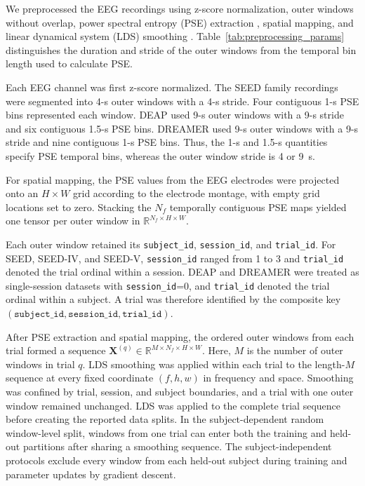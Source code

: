 ﻿\documentclass[12pt]{article}
\begin{document}
We preprocessed the EEG recordings using z-score normalization, outer windows without overlap, power spectral entropy (PSE) extraction \cite{PSE}, spatial mapping, and linear dynamical system (LDS) smoothing \cite{ref65}. Table~\ref{tab:preprocessing_params} distinguishes the duration and stride of the outer windows from the temporal bin length used to calculate PSE.

Each EEG channel was first z-score normalized. The SEED family recordings were segmented into 4-s outer windows with a 4-s stride. Four contiguous 1-s PSE bins represented each window. DEAP used 9-s outer windows with a 9-s stride and six contiguous 1.5-s PSE bins. DREAMER used 9-s outer windows with a 9-s stride and nine contiguous 1-s PSE bins. Thus, the 1-s and 1.5-s quantities specify PSE temporal bins, whereas the outer window stride is 4 or 9~s.

For spatial mapping, the PSE values from the EEG electrodes were projected onto an $H \times W$ grid according to the electrode montage, with empty grid locations set to zero. Stacking the $N_f$ temporally contiguous PSE maps yielded one tensor per outer window in $\mathbb{R}^{N_f \times H \times W}$.

Each outer window retained its \texttt{subject\_id}, \texttt{session\_id}, and \texttt{trial\_id}. For SEED, SEED-IV, and SEED-V, \texttt{session\_id} ranged from 1 to 3 and \texttt{trial\_id} denoted the trial ordinal within a session. DEAP and DREAMER were treated as single-session datasets with \texttt{session\_id}=0, and \texttt{trial\_id} denoted the trial ordinal within a subject. A trial was therefore identified by the composite key $(\texttt{subject\_id},\texttt{session\_id},\texttt{trial\_id})$.

After PSE extraction and spatial mapping, the ordered outer windows from each trial formed a sequence $\mathbf{X}^{(q)} \in \mathbb{R}^{M \times N_f \times H \times W}$. Here, $M$ is the number of outer windows in trial $q$. LDS smoothing was applied within each trial to the length-$M$ sequence at every fixed coordinate $(f,h,w)$ in frequency and space. Smoothing was confined by trial, session, and subject boundaries, and a trial with one outer window remained unchanged. LDS was applied to the complete trial sequence before creating the reported data splits. In the subject-dependent random window-level split, windows from one trial can enter both the training and held-out partitions after sharing a smoothing sequence. The subject-independent protocols exclude every window from each held-out subject during training and parameter updates by gradient descent.
\end{document}
